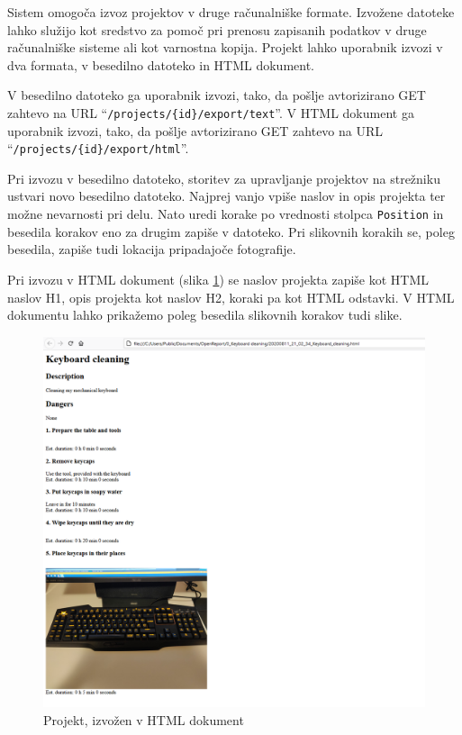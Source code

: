 \documentclass[a4paper, 12pt]{book}
\begin{document}
Sistem omogoča izvoz projektov v druge računalniške formate.
Izvožene datoteke lahko služijo kot sredstvo za pomoč pri prenosu zapisanih podatkov v druge računalniške sisteme ali kot varnostna kopija.
Projekt lahko uporabnik izvozi v dva formata, v besedilno datoteko in HTML dokument.

V besedilno datoteko ga uporabnik izvozi, tako, da pošlje avtorizirano GET zahtevo na URL \enquote{\texttt{/projects/\{id\}/export/text}}.
V HTML dokument ga uporabnik izvozi, tako, da pošlje avtorizirano GET zahtevo na URL \enquote{\texttt{/projects/\{id\}/export/html}}.

Pri izvozu v besedilno datoteko, storitev za upravljanje projektov na strežniku ustvari novo besedilno datoteko.
Najprej vanjo vpiše naslov in opis projekta ter možne nevarnosti pri delu.
Nato uredi korake po vrednosti stolpca \texttt{Position} in besedila korakov eno za drugim zapiše v datoteko.
Pri slikovnih korakih se, poleg besedila, zapiše tudi lokacija pripadajoče fotografije.

Pri izvozu v HTML dokument (slika \ref{export_html}) se naslov projekta zapiše kot HTML naslov H1, opis projekta kot naslov H2, koraki pa kot HTML odstavki.
V HTML dokumentu lahko prikažemo poleg besedila slikovnih korakov tudi slike.

\begin{figure}[H]
\begin{center}
\includegraphics[width=13cm]{export_html}
\end{center}
\caption{Projekt, izvožen v HTML dokument}
\label{export_html}
\end{figure}
\end{document}
